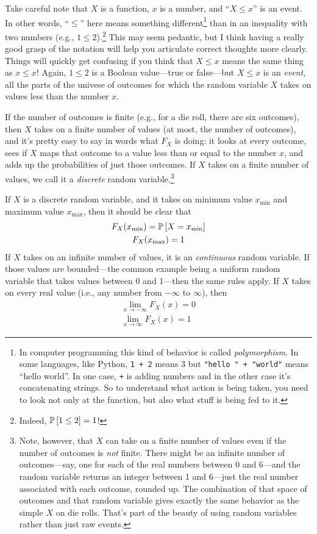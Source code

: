Take careful note that $X$ is a function, $x$ is a number, and
``$X \leq x$'' is an event. In other words, ``$\leq$'' here
means something different\footnote{In computer programming this kind of
behavior is called \emph{polymorphism}. In some languages, like Python,
\texttt{1 + 2} means 3 but \texttt{"hello " + "world"} means ``hello world''.
In one case, \texttt{+} is adding numbers and in the other case it's concatenating
strings. So to understand what action is being taken, you need to look not
only at the function, but also what stuff is being fed to it.} than in an
inequality with two numbers (e.g., $1 \leq 2$).\footnote{Indeed, $\mathbb{P}\left[{1 \leq
2}\right] = 1$!} This may seem pedantic, but I think having a really good grasp of
the notation will help you articulate correct thoughts more clearly. Things
will quickly get confusing if you think that $X \leq x$ means the same thing
as $x \leq x$! Again, $1 \leq 2$ is a Boolean value---true or false---but
$X \leq x$ is an \emph{event}, all the parts of the univese of outcomes for
which the random variable $X$ takes on values less than the number $x$.

If the number of outcomes is finite (e.g., for a die roll, there are six
outcomes), then $X$ takes on a finite number of values (at most, the number of
outcomes), and it's pretty easy to say in words what $F_X$ is doing:
it looks at every outcome, sees if $X$ maps that outcome to a value less than
or equal to the number $x$, and adds up the probabilities of just those
outcomes. If $X$ takes on a finite number of values, we call it a
\emph{discrete} random variable.\footnote{Note, however, that $X$ can take on
a finite number of values even if the number of outcomes is \emph{not} finite.
There might be an infinite number of outcomes---say, one for each of the real
numbers between 0 and 6---and the random variable returns an integer between 1
and 6---just the real number associated with each outcome, rounded up. The
combination of that space of outcomes and that random variable gives exactly
the same behavior as the simple $X$ on die rolls. That's part of the beauty of
using random variables rather than just raw events.}

If $X$ is a discrete random variable, and it takes on minimum value
$x_\mathrm{min}$ and maximum value $x_\mathrm{max}$, then it should be clear
that
\begin{gather}
F_X(x_\mathrm{min}) = \mathbb{P}\left[{X = x_\mathrm{min}}\right] \\
F_X(x_\mathrm{max}) = 1
\end{gather}
If $X$ takes on an infinite number of values, it is an \emph{continuous}
random variable. If those values are bounded---the common example being a
uniform random variable that takes values between 0 and 1---then the same
rules apply.
If $X$ takes on every real value (i.e., any number from $-\infty$ to $\infty$),
then
\begin{gather}
\lim_{x \to -\infty} F_X(x) = 0 \\
\lim_{x \to \infty} F_X(x) = 1
\end{gather}


